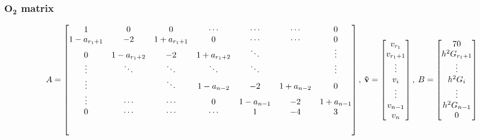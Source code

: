 \subsubsection{$\mathbf{O_2}$ matrix}
\setlength{\extrarowheight}{1.25\baselineskip}
\begin{equation}
A=
\begin{bmatrix}
1 & 0 & 0 & \cdots & \cdots & \cdots & 0\\
1-a_{r_1 + 1} & -2 & 1+a_{r_1 + 1} & 0 & \cdots & \cdots & 0\\
0 & 1-a_{r_1 + 2} & -2 & 1+a_{r_1 + 2} & \ddots & & \vdots\\
\vdots & \ddots & \ddots & \ddots & \ddots & & \vdots\\
\vdots & & \ddots & 1-a_{n-2} & -2 & 1+a_{n-2} & 0\\
\vdots & \cdots & \cdots & 0 & 1-a_{n-1} & -2 & 1+a_{n-1}\\
0 & \cdots & \cdots & \cdots & 1 & -4 & 3\\[5ex]
\end{bmatrix},\:
\mathbf{\vec{v}}=
\begin{bmatrix}
v_{r_1}\\
v_{r_1 + 1}\\
\vdots\\
v_i\\
\vdots\\
v_{n - 1}\\
v_n
\end{bmatrix},\:
B=
\begin{bmatrix}
70\\
h^2G_{r_1 + 1}\\
\vdots\\
h^2G_i\\
\vdots\\
h^2G_{n-1}\\
0
\end{bmatrix}
\end{equation}